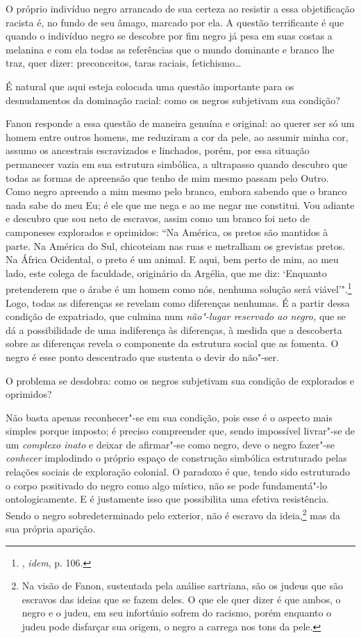 O próprio indivíduo negro arrancado de sua certeza ao resistir a essa
objetificação racista é, no fundo de seu âmago, marcado por ela. A
questão terrificante é que quando o indivíduo negro se descobre por fim
negro já pesa em suas costas a melanina e com ela todas as referências
que o mundo dominante e branco lhe traz, quer dizer: preconceitos, taras
raciais, fetichismo\ldots{}

É natural que aqui esteja colocada uma questão importante para os
desnudamentos da dominação racial: como os negros subjetivam sua
condição?

Fanon responde a essa questão de maneira genuína e original: ao querer
ser só um homem entre outros homens, me reduziram a cor da pele, ao
assumir minha cor, assumo os ancestrais escravizados e linchados, porém,
por essa situação permanecer vazia em sua estrutura simbólica, a
ultrapasso quando descubro que todas as formas de apreensão que tenho de
mim mesmo passam pelo Outro. Como negro apreendo a mim mesmo pelo
branco, embora sabendo que o branco nada sabe do meu Eu; é ele que me
nega e ao me negar me constitui. Vou adiante e descubro que sou neto de
escravos, assim como um branco foi neto de camponeses explorados e
oprimidos: ``Na América, os
pretos são mantidos à parte. Na América do Sul, chicoteiam nas ruas e
metralham os grevistas pretos. Na África Ocidental, o preto é um animal.
E aqui, bem perto de mim, ao meu lado, este colega de faculdade,
originário da Argélia, que me diz: `Enquanto pretenderem que o árabe é
um homem como nós, nenhuma solução será viável'".\footnote{, \emph{idem},
  p. 106.} Logo, todas as diferenças se revelam como diferenças
nenhumas. É a partir dessa condição de expatriado, que culmina num
\emph{não"-lugar reservado ao negro,} que se dá a possibilidade de uma
indiferença às diferenças, à medida que a descoberta sobre as diferenças
revela o componente da estrutura social que as fomenta. O negro é esse
ponto descentrado que sustenta o devir do não"-ser.

O problema se desdobra: como os negros subjetivam sua condição de
explorados e oprimidos?

Não basta apenas reconhecer"-se em sua condição, pois esse é o aspecto
mais simples porque imposto; é preciso compreender que, sendo impossível
livrar"-se de um \emph{complexo inato} e deixar de afirmar"-se como negro,
deve o negro fazer"-se \emph{conhecer} implodindo o próprio espaço de
construção simbólica estruturado pelas relações sociais de exploração
colonial. O paradoxo é que, tendo sido estruturado o corpo positivado do
negro como algo místico, não se pode fundamentá"-lo ontologicamente. E é
justamente isso que possibilita uma efetiva resistência. Sendo o negro
sobredeterminado pelo exterior, não é escravo da ideia,\footnote{Na visão
  de Fanon, sustentada pela análise sartriana, são os judeus que são
  escravos das ideias que se fazem deles. O que ele quer dizer é que
  ambos, o negro e o judeu, em seu infortúnio sofrem do racismo, porém
  enquanto o judeu pode disfarçar sua origem, o negro a carrega nos tons
  da pele.} mas da sua própria aparição.

